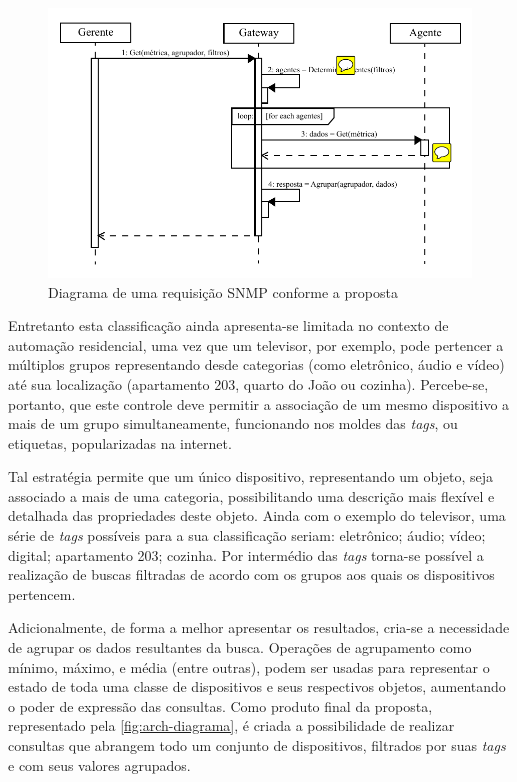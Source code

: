 \documentclass[twoside,english,brazilian]{UNISINOSmonografia}
\begin{document}
\begin{figure}
	\caption{Diagrama de uma requisição SNMP conforme a proposta}
	\label{fig:arch-diagrama}
	\centering
	\begin{minipage}{.8\textwidth}
		\includegraphics[width=\textwidth,keepaspectratio=true]{arch_diagrama}
	\end{minipage}
\end{figure}


Entretanto esta classificação ainda apresenta-se limitada no contexto de 
automação residencial, uma vez que um televisor, por exemplo, pode pertencer a 
múltiplos grupos representando desde categorias (como eletrônico, áudio e 
vídeo) até sua localização (apartamento 203, quarto do João ou cozinha).
Percebe-se, portanto, que este controle deve permitir a associação de um mesmo 
dispositivo a mais de um grupo simultaneamente, funcionando nos moldes das 
\textit{tags}, ou etiquetas, popularizadas na internet.


Tal estratégia permite que um único dispositivo, representando um objeto, seja 
associado a mais de uma categoria, possibilitando uma descrição mais flexível 
e detalhada das propriedades deste objeto.
Ainda com o exemplo do televisor, uma série de \textit{tags} possíveis para a 
sua classificação seriam: eletrônico; áudio; vídeo; digital; apartamento 203;
cozinha.
Por intermédio das \textit{tags} torna-se possível a realização de buscas 
filtradas de acordo com os grupos aos quais os dispositivos pertencem.


Adicionalmente, de forma a melhor apresentar os resultados, cria-se a 
necessidade de agrupar os dados resultantes da busca.
Operações de agrupamento como mínimo, máximo, e média (entre outras), podem 
ser usadas para representar o estado de toda uma classe de dispositivos e seus 
respectivos objetos, aumentando o poder de expressão das consultas.
Como produto final da proposta, representado pela \autoref{fig:arch-diagrama}, 
é criada a possibilidade de realizar consultas que abrangem 
todo um conjunto de dispositivos, filtrados por suas \textit{tags} e com seus 
valores agrupados.
\end{document}
